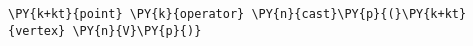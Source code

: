\begin{Verbatim}[commandchars=\\\{\}]
    \PY{k+kt}{point} \PY{k}{operator} \PY{n}{cast}\PY{p}{(}\PY{k+kt}{vertex} \PY{n}{V}\PY{p}{)}
\end{Verbatim}
